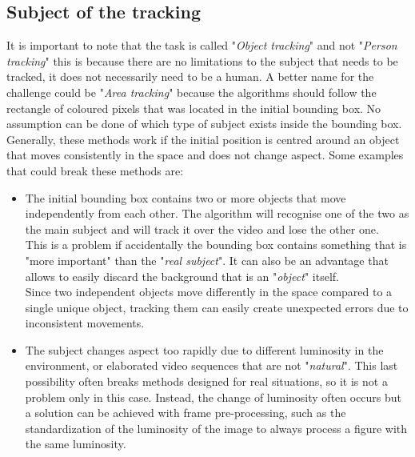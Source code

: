 \subsection{Subject of the tracking}
It is important to note that the task is called "\textit{Object tracking}" and not "\textit{Person tracking}" this is because there are no limitations to the subject that needs to be tracked, it does not necessarily need to be a human. A better name for the challenge could be "\textit{Area tracking}" because the algorithms should follow the rectangle of coloured pixels that was located in the initial bounding box. No assumption can be done of which type of subject exists inside the bounding box.\\
Generally, these methods work if the initial position is centred around an object that moves consistently in the space and does not change aspect. Some examples that could break these methods are:
\begin{itemize}
	\item The initial bounding box contains two or more objects that move independently from each other. The algorithm will recognise one of the two as the main subject and will track it over the video and lose the other one. \\
	This is a problem if accidentally the bounding box contains something that is "more important" than the "\textit{real subject}". It can also be an advantage that allows to easily discard the background that is an "\textit{object}" itself.\\
	Since two independent objects move differently in the space compared to a single unique object, tracking them can easily create unexpected errors due to inconsistent movements.
	\item The subject changes aspect too rapidly due to different luminosity in the environment, or elaborated video sequences that are not "\textit{natural}". This last possibility often breaks methods designed for real situations, so it is not a problem only in this case. Instead, the change of luminosity often occurs but a solution can be achieved with frame pre-processing, such as the standardization of the luminosity of the image to always process a figure with the same luminosity.
\end{itemize}


